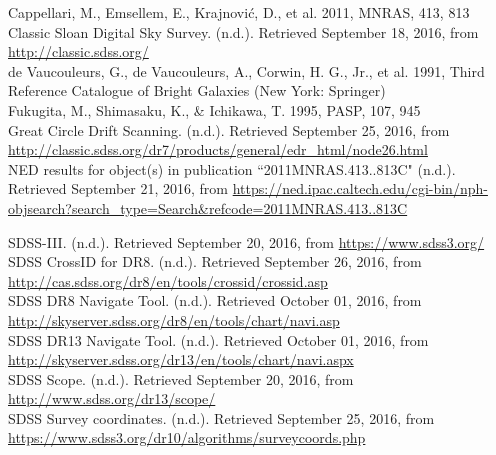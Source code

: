 \documentclass[10pt,letterpaper]{article}
\begin{document}
\newpage
\center
\begin{thebibliography}{1}
 Cappellari, M., Emsellem, E., Krajnovi\'c, D., et al. 2011, MNRAS, 413, 813\\

 Classic Sloan Digital Sky Survey. (n.d.). Retrieved September 18, 2016, from \url{http://classic.sdss.org/}\\

 de Vaucouleurs, G., de Vaucouleurs, A., Corwin, H. G., Jr., et al. 1991, Third
Reference Catalogue of Bright Galaxies (New York: Springer)\\

 Fukugita, M., Shimasaku, K., \& Ichikawa, T. 1995, PASP, 107, 945\\

 Great Circle Drift Scanning. (n.d.). Retrieved September 25, 2016, from \url{http://classic.sdss.org/dr7/products/general/edr_html/node26.html}\\

 NED results for object(s) in publication ``2011MNRAS.413..813C" (n.d.). Retrieved September 21, 2016, from \url{https://ned.ipac.caltech.edu/cgi-bin/nph-objsearch?search_type=Search&refcode=2011MNRAS.413..813C}

 SDSS-III. (n.d.). Retrieved September 20, 2016, from \url{https://www.sdss3.org/}\\

 SDSS CrossID for DR8. (n.d.). Retrieved September 26, 2016, from \url{http://cas.sdss.org/dr8/en/tools/crossid/crossid.asp}\\

 SDSS DR8 Navigate Tool. (n.d.). Retrieved October 01, 2016, from \url{http://skyserver.sdss.org/dr8/en/tools/chart/navi.asp}\\

 SDSS DR13 Navigate Tool. (n.d.). Retrieved October 01, 2016, from \url{http://skyserver.sdss.org/dr13/en/tools/chart/navi.aspx}\\

 SDSS Scope. (n.d.). Retrieved September 20, 2016, from \url{http://www.sdss.org/dr13/scope/}\\

 SDSS Survey coordinates. (n.d.). Retrieved September 25, 2016, from \url{https://www.sdss3.org/dr10/algorithms/surveycoords.php}\\


\end{thebibliography}
\end{document}
